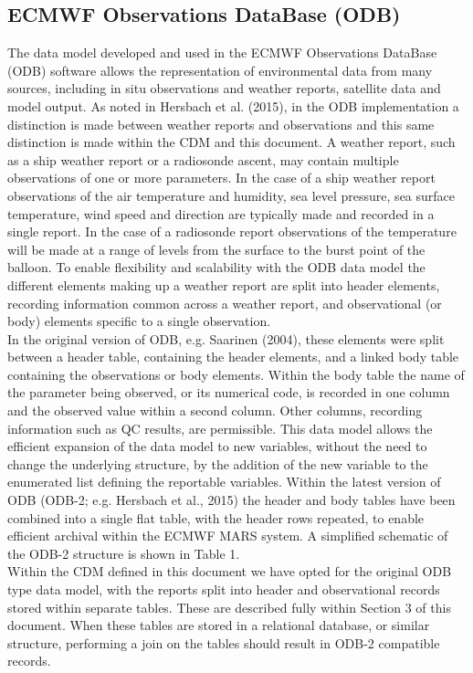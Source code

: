 \documentclass[a4paper,11pt]{article}
\begin{document}
\subsection{ECMWF Observations DataBase (ODB)}

The data model developed and used in the ECMWF Observations DataBase (ODB) software allows the representation of environmental data from many sources, including in situ observations and weather reports, satellite data and model output. As noted in Hersbach et al. (2015), in the ODB implementation a distinction is made between weather reports and observations and this same distinction is made within the CDM and this document.  A weather report, such as a ship weather report or a radiosonde ascent, may contain multiple observations of one or more parameters. In the case of a ship weather report observations of the air temperature and humidity, sea level pressure, sea surface temperature, wind speed and direction are typically made and recorded in a single report. In the case of a radiosonde report observations of the temperature will be made at a range of levels from the surface to the burst point of the balloon. To enable flexibility and scalability with the ODB data model the different elements making up a weather report are split into header elements, recording information common across a weather report, and observational (or body) elements specific to a single observation.\\

In the original version of ODB, e.g. Saarinen (2004), these elements were split between a header table, containing the header elements, and a linked body table containing the observations or body elements. Within the body table the name of the parameter being observed, or its numerical code, is recorded in one column and the observed value within a second column.  Other columns, recording information such as QC results, are permissible. This data model allows the efficient expansion of the data model to new variables, without the need to change the underlying structure, by the addition of the new variable to the enumerated list defining the reportable variables. Within the latest version of ODB (ODB-2; e.g. Hersbach et al., 2015) the header and body tables have been combined into a single flat table, with the header rows repeated, to enable efficient archival within the ECMWF MARS system. A simplified schematic of the ODB-2 structure is shown in Table 1.\\

Within the CDM defined in this document we have opted for the original ODB type data model, with the reports split into header and observational records stored within separate tables. These are described fully within Section 3 of this document. When these tables are stored in a relational database, or similar structure, performing a join on the tables should result in ODB-2 compatible records.\\
\end{document}

